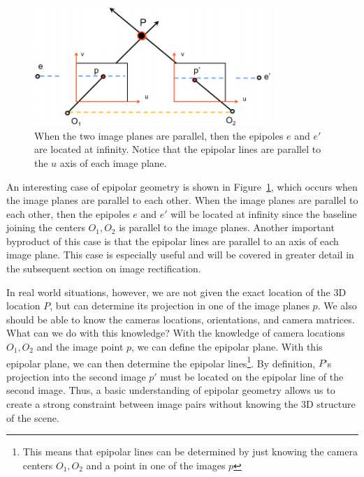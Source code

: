 \documentclass[a4paper, 12pt]{article}
\begin{document}
\begin{figure}[h!]
\centering
\includegraphics[width=0.8\textwidth]{figures/epipolar_parallel.png}
\caption{When the two image planes are parallel, then the epipoles $e$ and $e'$ are located at infinity. Notice that the epipolar lines are parallel to the $u$ axis of each image plane.}
\label{fig:epipolar_parallel}
\end{figure}

An interesting case of epipolar geometry is shown in Figure~\ref{fig:epipolar_parallel}, which occurs when the image planes are parallel to each other. When the image planes are parallel to each other, then the epipoles $e$ and $e'$ will be located at infinity since the baseline joining the centers $O_1,O_2$ is parallel to the image planes. Another important byproduct of this case is that the epipolar lines are parallel to an axis of each image plane. This case is especially useful and will be covered in greater detail in the subsequent section on image rectification.

In real world situations, however, we are not given the exact location of the 3D location $P$, but can determine its projection in one of the image planes $p$. We also should be able to know the cameras locations, orientations, and camera matrices. What can we do with this knowledge? With the knowledge of camera locations $O_1, O_2$ and the image point $p$, we can define the epipolar plane. With this epipolar plane, we can then determine the epipolar lines\footnote{This means that epipolar lines can be determined by just knowing the camera centers $O_1, O_2$ and a point in one of the images $p$}. By definition, $P$'s projection into the second image $p'$ must be located on the epipolar line of the second image. Thus, a  basic understanding of epipolar geometry allows us to create a strong constraint between image pairs without knowing the 3D structure of the scene. 
\end{document}
